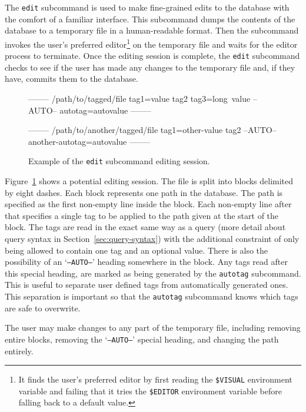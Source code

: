 The \texttt{edit} subcommand is used to make fine-grained edits to the database
with the comfort of a familiar interface. This subcommand dumps the contents of
the database to a temporary file in a human-readable format. Then the
subcommand invokes the user's preferred editor\footnote{It finds the user's
preferred editor by first reading the \texttt{\$VISUAL} environment variable and
failing that it tries the \texttt{\$EDITOR} environment variable before falling
back to a default value.} on the temporary file and waits for the editor
process to terminate. Once the editing session is complete, the \texttt{edit}
subcommand checks to see if the user has made any changes to the temporary
file and, if they have, commits them to the database.

\begin{figure}[h]
    \centering
    \begin{boxedverbatim}


--------
/path/to/tagged/file
tag1=value
tag2
tag3=long\ value
--AUTO--
autotag=autovalue
--------

--------
/path/to/another/tagged/file
tag1=other-value
tag2
--AUTO--
another-autotag=autovalue
--------
    \end{boxedverbatim}
    \label{fig:edit-subcommand-format}
    \caption{Example of the \texttt{edit} subcommand editing session.}
\end{figure}

Figure~\ref{fig:edit-subcommand-format} shows a potential editing session. The
file is split into blocks delimited by eight dashes. Each block represents one
path in the database. The path is specified as the first non-empty line inside
the block. Each non-empty line after that specifies a single tag to be applied
to the path given at the start of the block. The tags are read in the exact
same way as a query (more detail about query syntax in
Section~\ref{sec:query-syntax}) with the additional constraint of only being
allowed to contain one tag and an optional value. There is also the possibility
of an `\texttt{--AUTO--}' heading somewhere in the block. Any tags read after
this special heading, are marked as being generated by the \texttt{autotag}
subcommand. This is useful to separate user defined tags from automatically
generated ones. This separation is important so that the \texttt{autotag}
subcommand knows which tags are safe to overwrite. 

The user may make changes to any part of the temporary file, including removing
entire blocks, removing the `\texttt{--AUTO--}' special heading, and changing
the path entirely.

